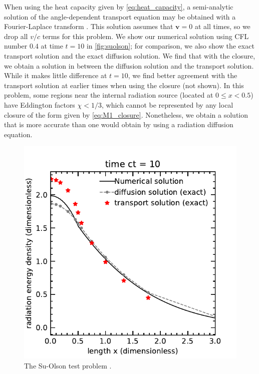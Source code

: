 \documentclass[fleqn,usenatbib]{mnras}
\newcommand{\vc}[1]{{\mathbf{#1}}}
\begin{document}
When using the heat capacity given by \autoref{eq:heat_capacity}, a semi-analytic solution of the angle-dependent transport equation may be obtained with a Fourier-Laplace transform \citep{Su_1997}. This solution assumes that $\vc{v} = 0$ at all times, so we drop all $v/c$ terms for this problem. We show our numerical solution using CFL number $0.4$ at time $t = 10$  in \autoref{fig:suolson}; for comparison, we also show the exact transport solution and the exact diffusion solution. We find that with the \cite{Levermore_1984} closure, we obtain a solution in between the diffusion solution and the transport solution. While it makes little difference at $t = 10$, we find better agreement with the transport solution at earlier times when using the \cite{Minerbo_1978} closure (not shown). In this problem, some regions near the internal radiation source (located at $0 \leq x < 0.5$) have Eddington factors $\chi < 1/3$, which cannot be represented by any local closure of the form given by \autoref{eq:M1_closure}.  Nonetheless, we obtain a solution that is more accurate than one would obtain by using a radiation diffusion equation.
\begin{figure}
    \includegraphics[width=\columnwidth]{SuOlsonTest.pdf}
    \caption{The Su-Olson test problem \citep{Su_1997}.}
    \label{fig:suolson}
\end{figure}
\end{document}
